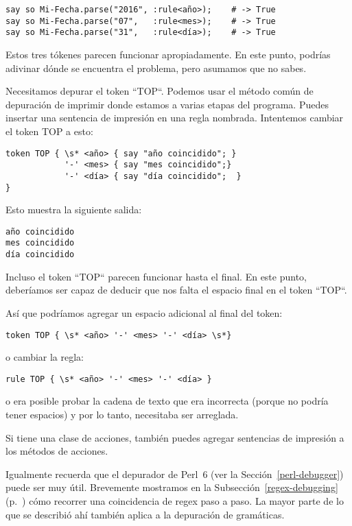 \begin{lstlisting}
say so Mi-Fecha.parse("2016", :rule<año>);    # -> True
say so Mi-Fecha.parse("07",   :rule<mes>);    # -> True
say so Mi-Fecha.parse("31",   :rule<día>);    # -> True
\end{lstlisting}

Estos tres tókenes parecen funcionar apropiadamente. En este punto,
podrías adivinar dónde se encuentra el problema, pero 
asumamos que no sabes.

Necesitamos depurar el token ``TOP``. Podemos usar el método común
de depuración de imprimir donde estamos a varias etapas del
programa. Puedes insertar una sentencia de impresión en
una regla nombrada. Intentemos cambiar el token TOP a esto:

\begin{lstlisting}
token TOP { \s* <año> { say "año coincidido"; }
            '-' <mes> { say "mes coincidido";}
            '-' <día> { say "día coincidido";  }
}
\end{lstlisting}

Esto muestra la siguiente salida:

\begin{lstlisting}
año coincidido
mes coincidido
día coincidido
\end{lstlisting}


Incluso el token ``TOP`` parecen funcionar hasta el final. 
En este punto, deberíamos ser capaz de deducir que nos falta
el espacio final en el token ``TOP``.

Así que podríamos agregar un espacio adicional al final del
token:

\begin{lstlisting}
token TOP { \s* <año> '-' <mes> '-' <día> \s*}
\end{lstlisting}

o cambiar la regla:

\begin{lstlisting}
rule TOP { \s* <año> '-' <mes> '-' <día> }
\end{lstlisting}

o era posible probar la cadena de texto que era incorrecta (porque
no podría tener espacios) y por lo tanto, necesitaba ser arreglada.

Si tiene una clase de acciones, también puedes agregar sentencias de
impresión a los métodos de acciones.

Igualmente recuerda que el depurador de Perl~6 (ver 
la Sección~\ref{perl-debugger}) puede ser muy útil. 
Brevemente mostramos en la Subsección~\ref{regex-debugging} 
(p.~\pageref{regex-debugging}) cómo recorrer una coincidencia
de regex paso a paso. La mayor parte de lo que se describió 
ahí también aplica a la depuración de gramáticas.

